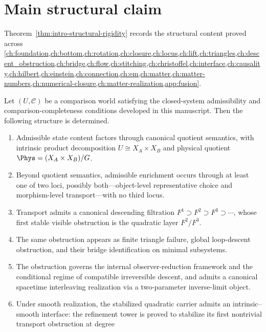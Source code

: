 \section{Main structural claim}
Theorem~\ref{thm:intro-structural-rigidity} records the structural
content proved across
\cref{ch:foundation,ch:bottom,ch:rotation,ch:closure,ch:locus,ch:lift,ch:triangles,ch:descent_obstruction,ch:bridge,ch:flow,ch:stitching,ch:christoffel,ch:interface,ch:causality,ch:hilbert,ch:einstein,ch:connection,ch:em,ch:matter,ch:matter-numbers,ch:numerical-closure,ch:matter-realization,app:fusion}.

\begin{theorem}
	\label{thm:intro-structural-rigidity}
	Let \((U,\mathcal C)\) be a comparison world satisfying the closed-system
	admissibility and comparison-completeness conditions developed in this
	manuscript.
	Then the following structure is determined.
	\begin{enumerate}[label=\textup{(\arabic*)}]
		\item
		      Admissible state content factors through canonical quotient
		      semantics, with intrinsic product decomposition
		      \(U\cong X_A\times X_B\) and physical quotient
		      \(\Phys=(X_A\times X_B)/G\).
		\item
		      Beyond quotient semantics, admissible enrichment occurs through at
		      least one of two loci, possibly both---object-level representative
		      choice and morphism-level transport---with no third locus.
		\item
		      Transport admits a canonical descending filtration
		      \(F^1\supset F^2\supset F^3\supset\cdots\),
		      whose first stable visible obstruction is the quadratic layer
		      \(F^2/F^3\).
		\item
		      The same obstruction appears as finite triangle failure,
		      global loop-descent obstruction, and their bridge identification on
		      minimal subsystems.
		\item
		      The obstruction governs the internal observer-reduction framework and
		      the conditional regime of compatible irreversible descent, and admits
		      a canonical spacetime interleaving realization via a two-parameter
		      inverse-limit object.
		\item
		      Under smooth realization, the stabilized quadratic carrier admits an
		      intrinsic--smooth interface: the refinement tower is proved to
		      stabilize its first nontrivial transport obstruction at degree

\end{enumerate}
\end{theorem}
